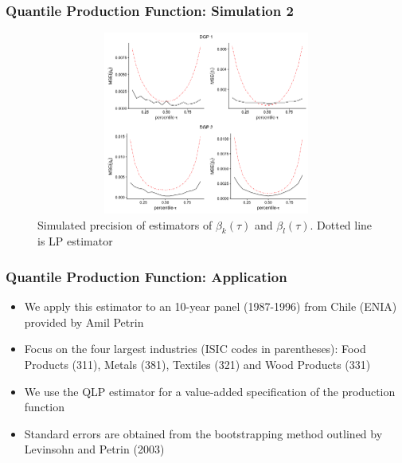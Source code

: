 \documentclass{beamer}
\begin{document}

\begin{frame}
\frametitle{Quantile Production Function: Simulation 2}
\begin{figure}[H]
\centering
\caption{Simulated precision of estimators of $\beta_{k}(\tau)$ and $\beta_{l}(\tau)$. Dotted line is LP estimator}
\includegraphics[width=12cm, height=6cm, keepaspectratio]{LP_MSE_Plot.png}
\end{figure}
\end{frame}



\begin{frame}
\frametitle{Quantile Production Function: Application}
\begin{itemize}
	\item We apply this estimator to an 10-year panel (1987-1996) from Chile (ENIA) provided by Amil Petrin 
	\item Focus on the four largest industries (ISIC codes in parentheses): Food Products (311), Metals (381), Textiles (321) and Wood Products (331)
	\item We use the QLP estimator for a value-added specification of the production function
	\item Standard errors are obtained from the bootstrapping method outlined by Levinsohn and Petrin (2003)
\end{itemize}
\end{frame}

\end{document}
